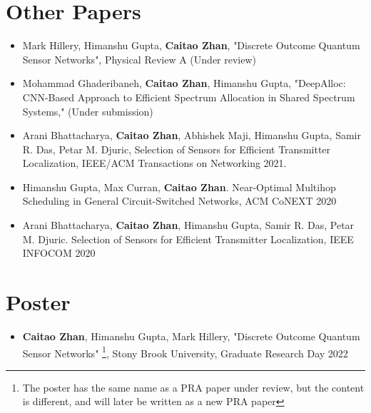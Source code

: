 \section*{Other Papers}
\begin{itemize}

    \item Mark Hillery, Himanshu Gupta, \textbf{Caitao Zhan}, "Discrete Outcome Quantum Sensor Networks", Physical Review A (Under review)

    \item Mohammad Ghaderibaneh, \textbf{Caitao Zhan}, Himanshu Gupta, "DeepAlloc: CNN-Based Approach to Efficient Spectrum Allocation in Shared Spectrum Systems," (Under submission)

    \item Arani Bhattacharya, \textbf{Caitao Zhan}, Abhishek Maji, Himanshu Gupta, Samir R. Das, Petar M. Djuric, Selection of Sensors for Efficient Transmitter Localization, IEEE/ACM Transactions on Networking 2021.

    \item Himanshu Gupta, Max Curran, \textbf{Caitao Zhan}. Near-Optimal Multihop Scheduling in General Circuit-Switched Networks, ACM CoNEXT 2020
    
    \item Arani Bhattacharya, \textbf{Caitao Zhan}, Himanshu Gupta, Samir R. Das, Petar M. Djuric. Selection of Sensors for Efficient Transmitter Localization, IEEE INFOCOM 2020
  
\end{itemize}

\section*{Poster}
\begin{itemize}

    \item \textbf{Caitao Zhan}, Himanshu Gupta, Mark Hillery, "Discrete Outcome Quantum Sensor Networks"
    \footnote{The poster has the same name as a PRA paper under review, but the content is different, and will later be written as a new PRA paper}, Stony Brook University, Graduate Research Day 2022
  
\end{itemize}